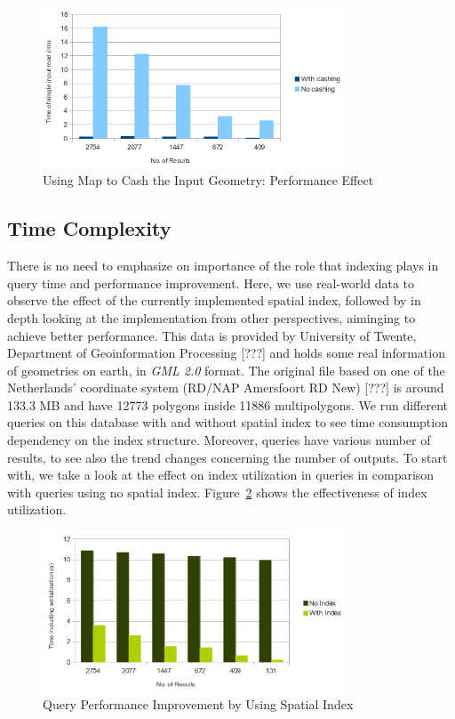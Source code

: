 \documentclass[a4paper,12pt]{article}
\begin{document}
 \begin{figure}
\centering
\includegraphics[width=0.8\textwidth]{MapIndexing}
\caption{Using Map to Cash the Input Geometry: Performance Effect}
\label{figMap}
\end{figure}

\subsection{Time Complexity}

There is no need to emphasize on importance of the role that indexing plays in query time and performance improvement. Here, we use real-world data to observe the effect of the currently implemented spatial index, followed by in depth looking at the implementation from other perspectives, aiminging to achieve better performance. This data is provided by University of Twente, Department of Geoinformation Processing [???] and holds some real information of geometries on earth, in \textit{GML 2.0} format. The original file based on one of the Netherlands' coordinate system (RD/NAP Amersfoort RD New) [???] is around 133.3 MB and have 12773 polygons inside 11886 multipolygons.
We run different queries on this database with and without spatial index to see time consumption dependency on the index structure. Moreover, queries have various number of results, to see also the trend changes concerning the number of outputs.
To start with, we take a look at the effect on index utilization in queries in comparison with queries using no spatial index. Figure~\ref{figIndexEfficiency} shows the effectiveness of index utilization.

 \begin{figure}
\centering
\includegraphics[width=0.8\textwidth]{IndexEfficiency}
\caption{Query Performance Improvement by Using Spatial Index}
\label{figIndexEfficiency}
\end{figure}
\end{document}
